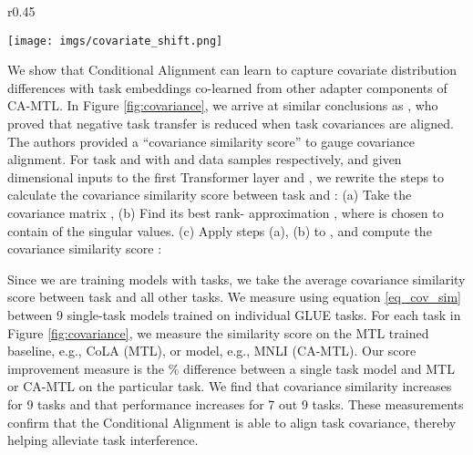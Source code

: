 \documentclass{article} \usepackage{iclr2021_conference,times}
\begin{document}
\begin{wrapfigure}[14]{r}{0.45\textwidth}
    \begin{center}
        \vspace{-16pt}
        \hspace{-5pt}
        \texttt{[image: imgs/covariate\_shift.png]}
    \end{center}
     \caption{\label{fig:covariance} \small
     Task performance vs. avg. covariance similarity scores (eq. \ref{eq_cov_sim}) for MTL and CA-MTL.}
\end{wrapfigure}

 We show that Conditional Alignment can learn to capture covariate distribution differences with task embeddings co-learned from other adapter components of CA-MTL. In Figure \ref{fig:covariance}, we arrive at similar conclusions as \cite{Wu2020Understanding}, who proved that negative task transfer is reduced when task covariances are aligned. The authors provided a ``covariance similarity score'' to gauge covariance alignment. For task  and  with  and  data samples respectively, and given  dimensional inputs to the first Transformer layer  and , we rewrite the steps to calculate the covariance similarity score between task  and :
(a) Take the covariance matrix ,
(b) Find its best rank- approximation , where  is chosen to contain  of the singular values.
(c) Apply steps (a), (b) to , and compute the covariance similarity score :


Since we are training models with  tasks, we take the average covariance similarity score  between task  and all other tasks. We measure  using equation \ref{eq_cov_sim} between 9 single-task models trained on individual GLUE tasks. For each task in Figure \ref{fig:covariance}, we measure the similarity score on the MTL trained  baseline, e.g., CoLA (MTL), or  model, e.g., MNLI (CA-MTL). Our score improvement measure is the \% difference between a single task model and MTL or CA-MTL on the particular task. We find that covariance similarity increases for 9 tasks and that performance increases for 7 out 9 tasks. These measurements confirm that the Conditional Alignment is able to align task covariance, thereby helping alleviate task interference.
\end{document}

